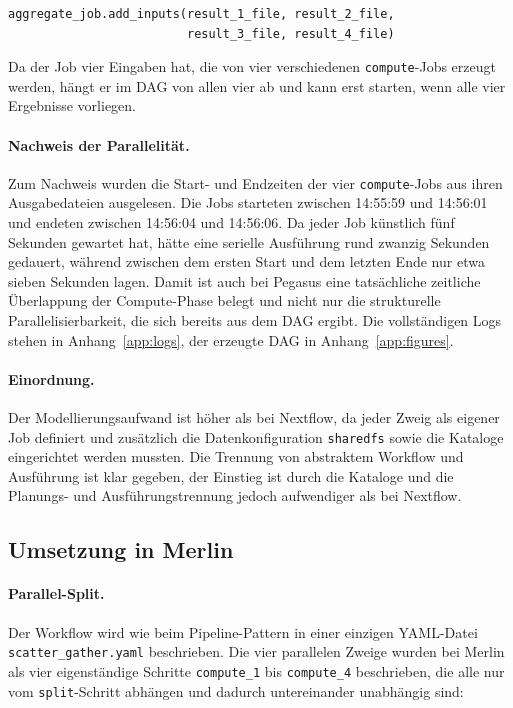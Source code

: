 \begin{lstlisting}[language=Python,caption={Eingaben des aggregate-Jobs (Pegasus, Scatter-Gather)},label={lst:sg:pg:agg}]
aggregate_job.add_inputs(result_1_file, result_2_file,
                         result_3_file, result_4_file)
\end{lstlisting}

Da der Job vier Eingaben hat, die von vier verschiedenen \texttt{compute}-Jobs erzeugt werden,
hängt er im DAG von allen vier ab und kann erst starten, wenn alle vier Ergebnisse vorliegen.

\paragraph{Nachweis der Parallelität.}
Zum Nachweis wurden die Start- und Endzeiten der vier \texttt{compute}-Jobs aus ihren Ausgabedateien
ausgelesen. Die Jobs starteten zwischen 14:55:59 und 14:56:01 und endeten zwischen 14:56:04 und
14:56:06. Da jeder Job künstlich fünf Sekunden gewartet hat, hätte eine serielle Ausführung rund
zwanzig Sekunden gedauert, während zwischen dem ersten Start und dem letzten Ende nur etwa sieben
Sekunden lagen. Damit ist auch bei Pegasus eine tatsächliche zeitliche Überlappung der Compute-Phase
belegt und nicht nur die strukturelle Parallelisierbarkeit, die sich bereits aus dem DAG ergibt. Die
vollständigen Logs stehen in Anhang~\ref{app:logs}, der erzeugte DAG in Anhang~\ref{app:figures}.

\paragraph{Einordnung.}
Der Modellierungsaufwand ist höher als bei Nextflow, da jeder Zweig als eigener Job definiert und
zusätzlich die Datenkonfiguration \texttt{sharedfs} sowie die Kataloge eingerichtet werden mussten.
Die Trennung von abstraktem Workflow und Ausführung ist klar gegeben, der Einstieg ist durch die
Kataloge und die Planungs- und Ausführungstrennung jedoch aufwendiger als bei Nextflow.

\subsection{Umsetzung in Merlin}
\label{sec:practical:scattergather:merlin}

\paragraph{Parallel-Split.}
Der Workflow wird wie beim Pipeline-Pattern in einer einzigen YAML-Datei
\texttt{scatter\_gather.yaml} beschrieben. Die vier parallelen Zweige wurden bei Merlin als vier eigenständige Schritte
\texttt{compute\_1} bis \texttt{compute\_4} beschrieben, die alle nur vom \texttt{split}-Schritt
abhängen und dadurch untereinander unabhängig sind:

